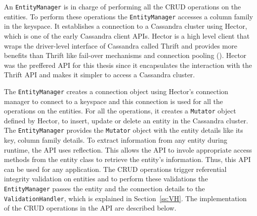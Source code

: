 	An \texttt{EntityManager} is in charge of performing all the \ac{CRUD}
	operations on the entities. To perform these
	operations  the \texttt{EntityManager}
	accesses a column family in the keyspace. It establishes a connection
	to a Cassandra cluster using Hector, which is one of the 
	 early Cassandra client \acp{API}.  Hector is a high level
	client that wraps the driver-level interface of Cassandra called Thrift and
	provides more benefits than Thrift like fail-over mechanisms and connection
	pooling ().  Hector was the preffered \ac{API} for this thesis
	since it encapsulates the interaction with the Thrift \ac{API} and makes it
	simpler to access a Cassandra cluster.
			
	The \texttt{EntityManager} creates a connection object
	using Hector's  connection manager to connect to a keyspace and this connection
	is used for all the operations on the entities.  For all the operations,
	it creates a \texttt{Mutator} object defined by Hector,  to
	insert,  update or delete an entity in the Cassandra cluster. The
	\texttt{EntityManager} provides the \texttt{Mutator} object with the entity
	details like its key, column family details. To extract  information
	from any entity during runtime, the \ac{API} uses reflection. This allows
	the \ac{API} to invole appropriate access methods from the entity class to
	retrieve the entity's information.
	Thus, this \ac{API} can be used for any application.
% 	
	The \ac{CRUD} operations trigger  referential
	integrity validation on entities and to
	perform these validations the \texttt{EntityManager} passes the
	entity and the connection details to the \texttt{ValidationHandler},
	which is explained in Section~\ref{ss:VH}.
	The implementation of the \ac{CRUD} operations in the \ac{API} are described
	below.
	
